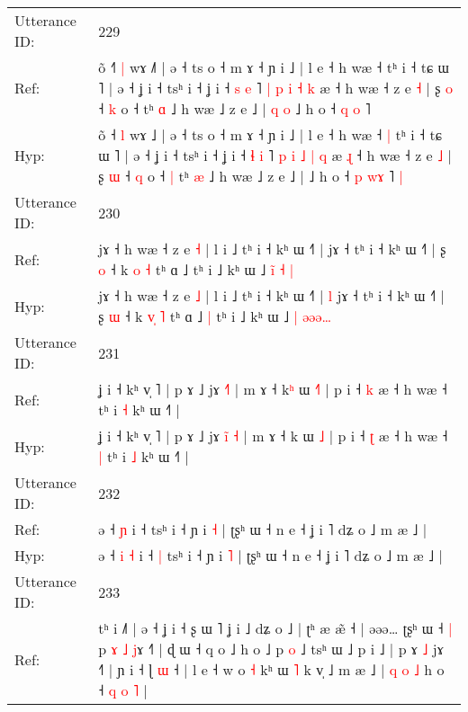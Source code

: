 \documentclass[10pt]{article}
\DeclareRobustCommand{\hl}[1]{{\textcolor{red}{#1}}}
\begin{document}
\begin{longtable}{ll}
 \\
\midrule
Utterance ID: & 229 \\
Ref: & õ ˧\hl{˥} \hl{|} wɤ ˩\hl{˥} | ə ˧ ts o ˧ m ɤ ˧ ɲ i ˩ | l e ˧ h wæ ˧\hl{}\hl{} tʰ i ˧ tɕ ɯ ˥ | ə ˧ ʝ i ˧ tsʰ i ˧ ʝ i ˧ \hl{s} \hl{e} ˥ \hl{|} \hl{p} \hl{i} \hl{˧} \hl{k} æ\hl{}\hl{} ˧ h wæ ˧ z e \hl{˧} | ʂ \hl{o} ˧ \hl{k} o ˧\hl{}\hl{} tʰ \hl{ɑ} ˩ h wæ ˩ z e ˩ |\hl{ }\hl{q}\hl{ }\hl{o} ˩ h o ˧ \hl{q} \hl{}\hl{o} ˥\hl{}\hl{}
 \\
Hyp: & õ ˧\hl{} \hl{l} wɤ ˩\hl{} | ə ˧ ts o ˧ m ɤ ˧ ɲ i ˩ | l e ˧ h wæ ˧\hl{ }\hl{|} tʰ i ˧ tɕ ɯ ˥ | ə ˧ ʝ i ˧ tsʰ i ˧ ʝ i ˧ \hl{ɬ} \hl{i} ˥ \hl{p} \hl{i} \hl{˩} \hl{|} \hl{q} æ\hl{ }\hl{ɻ} ˧ h wæ ˧ z e \hl{˩} | ʂ \hl{ɯ} ˧ \hl{q} o ˧\hl{ }\hl{|} tʰ \hl{æ} ˩ h wæ ˩ z e ˩ |\hl{}\hl{}\hl{}\hl{} ˩ h o ˧ \hl{p} \hl{w}\hl{ɤ} ˥\hl{ }\hl{|}
 \\
\midrule
Utterance ID: & 230 \\
Ref: & jɤ ˧ h wæ ˧ z e \hl{˧} | l i ˩ tʰ i ˧ kʰ ɯ ˧˥ |\hl{}\hl{} jɤ ˧ tʰ i ˧ kʰ ɯ ˧˥ | ʂ \hl{o} ˧ k \hl{}\hl{o} \hl{˧} tʰ ɑ ˩\hl{}\hl{} tʰ i ˩ kʰ ɯ ˩ \hl{i}\hl{̃}\hl{ }\hl{˧}\hl{ }\hl{|}
 \\
Hyp: & jɤ ˧ h wæ ˧ z e \hl{˩} | l i ˩ tʰ i ˧ kʰ ɯ ˧˥ |\hl{ }\hl{l} jɤ ˧ tʰ i ˧ kʰ ɯ ˧˥ | ʂ \hl{ɯ} ˧ k \hl{v}\hl{̩} \hl{˥} tʰ ɑ ˩\hl{ }\hl{|} tʰ i ˩ kʰ ɯ ˩ \hl{|}\hl{ }\hl{ə}\hl{ə}\hl{ə}\hl{…}
 \\
\midrule
Utterance ID: & 231 \\
Ref: & ʝ i ˧ kʰ v̩ ˥ | p ɤ ˩ jɤ \hl{}\hl{}\hl{˧}\hl{˥} | m ɤ ˧ k\hl{ʰ} ɯ \hl{˧}\hl{˥} | p i ˧ \hl{k} æ ˧ h wæ ˧\hl{}\hl{} tʰ i \hl{˧} kʰ ɯ ˧˥ |
 \\
Hyp: & ʝ i ˧ kʰ v̩ ˥ | p ɤ ˩ jɤ \hl{i}\hl{̃}\hl{ }\hl{˧} | m ɤ ˧ k\hl{} ɯ \hl{}\hl{˩} | p i ˧ \hl{ʈ} æ ˧ h wæ ˧\hl{ }\hl{|} tʰ i \hl{˩} kʰ ɯ ˧˥ |
 \\
\midrule
Utterance ID: & 232 \\
Ref: & ə ˧\hl{}\hl{} \hl{ɲ} i ˧\hl{}\hl{} tsʰ i ˧ ɲ i \hl{˧} | ʈʂʰ ɯ ˧ n e ˧ ʝ i ˥ dʑ o ˩ m æ ˩ |
 \\
Hyp: & ə ˧\hl{ }\hl{i} \hl{˧} i ˧\hl{ }\hl{|} tsʰ i ˧ ɲ i \hl{˥} | ʈʂʰ ɯ ˧ n e ˧ ʝ i ˥ dʑ o ˩ m æ ˩ |
 \\
\midrule
Utterance ID: & 233 \\
Ref: & tʰ i ˩˥ | ə ˧ ʝ i ˧ ʂ ɯ ˥ ʝ i ˩ dʑ o ˩ | ʈʰ æ æ̃ ˧\hl{} | əəə… ʈʂʰ ɯ ˧\hl{ }\hl{|} p\hl{ }\hl{ɤ}\hl{ }\hl{˩} \hl{j}ɤ ˧\hl{˥} | ɖ ɯ ˧ q o ˩ h o ˩ p \hl{o} ˩ tsʰ ɯ ˩\hl{}\hl{} p i ˩ | p ɤ\hl{ }\hl{˩} jɤ ˧˥ | ɲ i ˧ ɭ\hl{ }\hl{ɯ} ˧ | l e ˧ w o \hl{˧} kʰ ɯ \hl{˥} k v̩ ˩ m æ ˩ |\hl{ }\hl{q} \hl{o}\hl{ }\hl{˩} h o ˧ \hl{q} \hl{}\hl{o} \hl{˥} |

\end{longtable}
\end{document}
